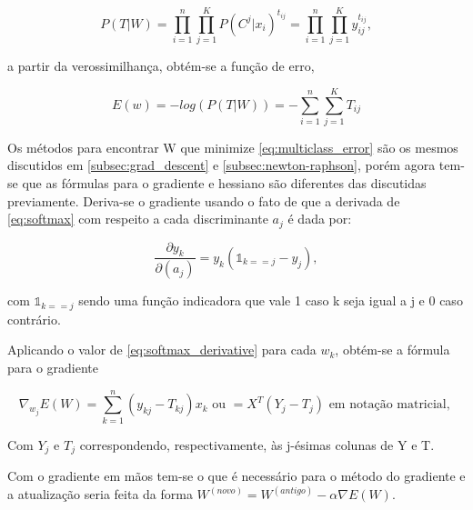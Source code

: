 \begin{center}
	\begin{equation}
				P(T | W) = \prod_{i = 1}^{n} \prod_{j = 1}^{K} P(C^j | x_i)^{t_{ij}} = \prod_{i = 1}^{n} \prod_{j = 1}^{K} y_{ij}^{t_{ij}},
	\end{equation}
\end{center}

a partir da verossimilhança, obtém-se a função de erro,

\begin{center}
	\begin{equation}
		\label{eq:multiclass_error}
		E(w) = - log(P(T | W)) = - \sum_{i = 1}^{n} \sum_{j = 1}^{K} T_{ij}
	\end{equation}
\end{center}

Os métodos para encontrar W que minimize \ref{eq:multiclass_error} são os mesmos discutidos em
\ref{subsec:grad_descent} e \ref{subsec:newton-raphson}, porém agora tem-se que as fórmulas
para o gradiente e hessiano são diferentes das discutidas previamente. Deriva-se o gradiente
usando o fato de que a derivada de \ref{eq:softmax} com respeito a cada discriminante $a_j$
é dada por:


\begin{center}
	\begin{equation}\label{eq:softmax_derivative}
		\frac{\partial y_k}{\partial (a_j)} = y_k(\mathds{1}_{k == j} - y_j),
	\end{equation}
\end{center}

com $\mathds{1}_{k == j}$ sendo uma função indicadora que vale 1 caso k seja igual a j e 0 caso
contrário.

Aplicando o valor de \ref{eq:softmax_derivative} para cada $w_k$, obtém-se a fórmula para o gradiente

\begin{center}
	\begin{equation}
		\nabla_{w_j} E(W) = \sum_{k = 1}^n (y_{kj} - T_{kj})x_k \text{ ou } = X^T(Y_{j} - T_{j}) \text{ em notação matricial, }
	\end{equation}
\end{center}

Com $Y_j$ e $T_j$ correspondendo, respectivamente, às j-ésimas colunas de Y e T.

Com o gradiente em mãos tem-se o que é necessário para o método do gradiente e a
atualização seria feita da forma $W^{ (novo) } = W^{ (antigo) } - \alpha \nabla E(W)$.

